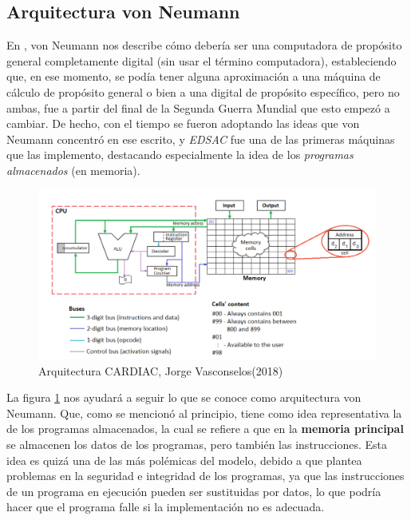 \documentclass[letterpaper,12pt,oneside]{book}
\begin{document}
		\subsection{Arquitectura von Neumann}
		
		En \cite{von_neumann_papers_1987}, von Neumann nos describe cómo debería ser una computadora de propósito general completamente digital (sin usar el 
		término computadora), estableciendo que, en ese momento, se podía tener alguna aproximación a una máquina de cálculo de propósito general o
		bien a una digital de propósito específico, pero no ambas, fue a partir del final de la Segunda Guerra Mundial que esto empezó a cambiar. De hecho,
		con el tiempo se fueron adoptando las ideas que von Neumann concentró en ese escrito, y \textit{EDSAC} fue una de las primeras máquinas
		que las implemento, destacando especialmente la idea de los \textit{programas almacenados} (en memoria).
		
		\begin{figure}[h]
			\includegraphics[scale=0.3]{media/Arquitectura_CARDIAC.png}
			\caption{Arquitectura CARDIAC, Jorge Vasconselos(2018) }%
			\label{fig:Arq_CARDIAC}
		\end{figure}
		
		La figura \ref{fig:Arq_CARDIAC} nos ayudará a seguir lo que
		se conoce como arquitectura von Neumann. Que, como se mencionó al principio, tiene
		como idea representativa la de los programas almacenados, la cual se refiere a que en la \textbf{memoria principal} se almacenen los datos de
		los programas, pero también las instrucciones. Esta idea es quizá una de las más polémicas del modelo, debido a que plantea problemas en la
		seguridad e integridad de los programas, ya que las instrucciones de un programa en ejecución pueden ser sustituidas por datos, lo que
		podría hacer que el programa falle si la implementación no es adecuada.
\end{document}
